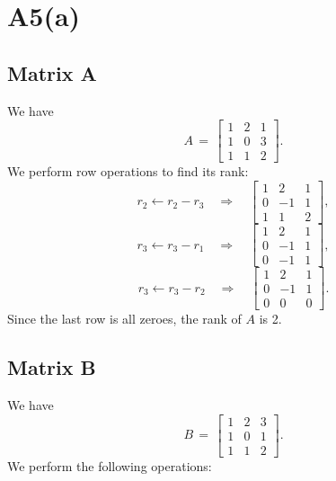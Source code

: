 \documentclass{article}
\begin{document}
\section*{A5(a)}

\subsection*{Matrix A}
We have 
\[
A 
\,=\, 
\begin{bmatrix}
1 & 2 & 1\\
1 & 0 & 3\\
1 & 1 & 2
\end{bmatrix}.
\]
We perform row operations to find its rank:
\[
r_2 \leftarrow r_2 - r_3 
\quad\Longrightarrow\quad
\begin{bmatrix}
1 & 2 & 1\\
0 & -1 & 1\\
1 & 1 & 2
\end{bmatrix},
\]
\[
r_3 \leftarrow r_3 - r_1
\quad\Longrightarrow\quad
\begin{bmatrix}
1 & 2 & 1\\
0 & -1 & 1\\
0 & -1 & 1
\end{bmatrix},
\]
\[
r_3 \leftarrow r_3 - r_2
\quad\Longrightarrow\quad
\begin{bmatrix}
1 & 2 & 1\\
0 & -1 & 1\\
0 & 0 & 0
\end{bmatrix}.
\]
Since the last row is all zeroes, the rank of \(A\) is 2.

\subsection*{Matrix B}
We have
\[
B 
\,=\, 
\begin{bmatrix}
1 & 2 & 3\\
1 & 0 & 1\\
1 & 1 & 2
\end{bmatrix}.
\]
We perform the following operations:
\end{document}
